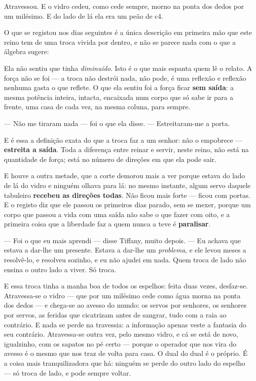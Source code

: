 \documentclass[livro.tex]{subfiles}
\begin{document}
\medskip

Atravessou. E o vidro cedeu, como cede sempre, morno na ponta dos dedos por um milésimo. E
do lado de lá ela era um peão de \textsf{c4}.

\medskip

O que se registou nos dias seguintes é a única descrição em primeira mão que este reino
tem de uma troca vivida por dentro, e não se parece nada com o que a álgebra sugere:

Ela não sentiu que tinha \emph{diminuído}. Isto é o que mais espanta quem lê o relato. A
força não se foi --- a troca não destrói nada, não pode, é uma reflexão e reflexão nenhuma
gasta o que reflete. O que ela sentiu foi a força ficar \textbf{sem saída}: a mesma
potência inteira, intacta, encaixada num corpo que só sabe ir para a frente, uma casa de
cada vez, na mesma coluna, para sempre.

--- Não me tiraram nada --- foi o que ela disse. --- Estreitaram-me a porta.

E é essa a definição exata do que a troca faz a um senhor: não o empobrece --- \textbf{estreita
a saída}. Toda a diferença entre reinar e servir, neste reino, não está na quantidade de
força; está no número de direções em que ela pode sair.

\medskip

E houve a outra metade, que a corte demorou mais a ver porque estava do lado de lá do
vidro e ninguém olhava para lá: no mesmo instante, algum servo daquele tabuleiro
\textbf{recebeu as direções todas}. Não ficou mais forte --- ficou com portas. E o
registo diz que ele passou os primeiros dias parado, sem se mexer, porque um corpo que
passou a vida com uma saída não sabe o que fazer com oito, e a primeira coisa que a
liberdade faz a quem nunca a teve é \textbf{paralisar}.

--- Foi o que eu mais aprendi --- disse Tiffany, muito depois. --- Eu achava que estava a
dar-lhe um presente. Estava a dar-lhe um \emph{problema}, e ele levou meses a resolvê-lo,
e resolveu sozinho, e eu não ajudei em nada. Quem troca de lado não ensina o outro lado a
viver. Só troca.

\medskip

E essa troca tinha a manha boa de todos os espelhos: feita duas vezes, desfaz-se.
Atravessa-se o vidro --- que por um milésimo cede como água morna na ponta dos dedos ---
e chega-se ao avesso do mundo: os servos por senhores, os senhores por servos, as feridas
que cicatrizam antes de sangrar, tudo com a raia ao contrário. E nada se perde na
travessia: a informação apenas veste a fantasia do seu contrário. Atravessa-se outra vez,
pelo mesmo vidro, e cá se está de novo, igualzinho, com os sapatos no pé certo --- porque
o operador que nos vira do avesso é o mesmo que nos traz de volta para casa. O dual do
dual é o próprio. É a coisa mais tranquilizadora que há: ninguém se perde do outro lado do
espelho --- só troca de lado, e pode sempre voltar.
\end{document}
